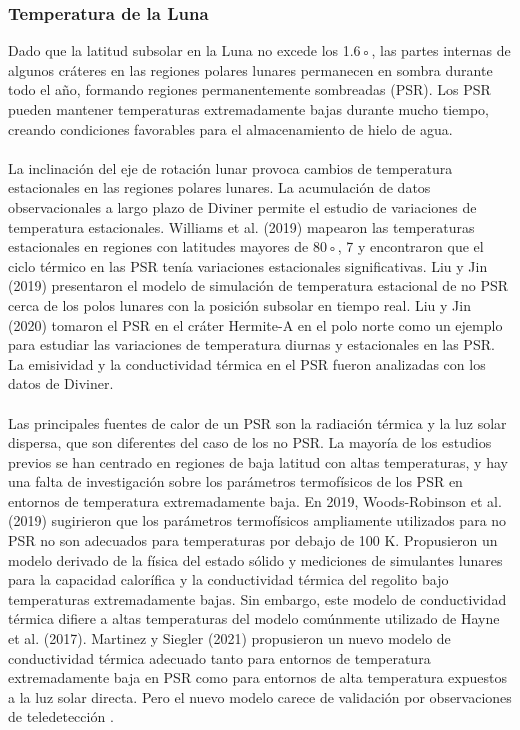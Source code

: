 \documentclass[12pt]{article}
\begin{document}
\subsubsection{Temperatura de la Luna}
Dado que la latitud subsolar en la Luna no excede los 1.6◦, las partes 
internas de algunos cráteres en las regiones polares lunares permanecen en sombra 
durante todo el año, formando regiones permanentemente sombreadas (PSR). 
Los PSR pueden mantener temperaturas extremadamente bajas durante mucho tiempo, creando 
condiciones favorables para el almacenamiento de hielo de agua.\\
\\
La inclinación del eje de rotación lunar provoca cambios de temperatura estacionales 
en las regiones polares lunares. La acumulación de datos observacionales a largo plazo 
de Diviner permite el estudio de variaciones de temperatura estacionales. Williams et al. 
(2019) mapearon las temperaturas estacionales en regiones con latitudes mayores de 80◦, 7
y encontraron que 
el ciclo térmico en las PSR tenía variaciones estacionales significativas. Liu y Jin 
(2019) presentaron el modelo de simulación de temperatura estacional de no PSR cerca de 
los polos lunares con la posición subsolar en tiempo real. Liu y 
Jin (2020) tomaron el PSR en el cráter Hermite-A en el polo norte como un 
ejemplo para estudiar las variaciones de temperatura diurnas y estacionales en 
las PSR. La emisividad y la conductividad térmica en el PSR fueron 
analizadas con los datos de Diviner.\\
\\
Las principales fuentes de calor de un PSR son la radiación térmica y la luz solar dispersa, 
que son diferentes del caso de los no PSR. La mayoría de los estudios previos 
se han centrado en regiones de baja latitud con altas temperaturas, y hay una falta de 
investigación sobre los parámetros termofísicos de los PSR 
en entornos de temperatura extremadamente baja. En 2019, Woods-Robinson 
et al. (2019) sugirieron que los parámetros termofísicos ampliamente utilizados 
para no PSR no son adecuados para temperaturas por debajo de 100 K. Propusieron un 
modelo derivado de la física del estado sólido y mediciones de simulantes lunares 
para la capacidad calorífica y la conductividad térmica del regolito bajo temperaturas 
extremadamente bajas. Sin embargo, este modelo de conductividad térmica 
difiere a altas temperaturas del modelo comúnmente utilizado de Hayne 
et al. (2017). Martinez y Siegler (2021) propusieron un nuevo modelo de 
conductividad térmica adecuado tanto para entornos de temperatura extremadamente baja 
en PSR como para entornos de alta temperatura expuestos a la luz solar directa. 
Pero el nuevo modelo carece de validación por observaciones de teledetección \parencite{Zhengling2024}.\\
\end{document}
